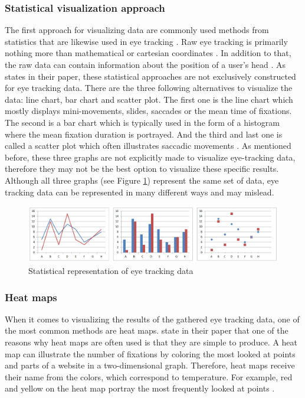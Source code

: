 \subsubsection{Statistical visualization approach}
The first approach for visualizing data are commonly used methods from statistics that are likewise used in eye tracking \autocite{blascheck2014state}. Raw eye tracking is primarily nothing more than mathematical or cartesian coordinates \autocite{blascheck2014state, biedert2010eyebook}. In addition to that, the raw data can contain information about the position of a user's head \autocite[]{biedert2010eyebook}. 
As \textcite[]{blascheck2014state} states in their paper, these statistical approaches are not exclusively constructed for eye tracking data. There are the three following alternatives to visualize the data: line chart, bar chart and scatter plot. The first one is the line chart which mostly displays mini-movements, slides, saccades or the mean time of fixations. The second is a bar chart which is typically used in the form of a histogram where the mean fixation duration is portrayed. And the third and last one is called a scatter plot which often illustrates saccadic movements \autocite[]{blascheck2014state}.
As mentioned before, these three graphs are not explicitly made to visualize eye-tracking data, therefore they may not be the best option to visualize these specific results.  Although all three graphs (see Figure \ref{figure:Statistics}) represent the same set of data, eye tracking data can be represented in many different ways and may mislead. 

\begin{figure}[!ht]
    \centering
    \includegraphics[width=1\linewidth]{images/statistics_blascheck2014state.png}
    \caption{
       Statistical representation of eye tracking data \autocite[7]{blascheck2014state}
    }
    \label{figure:Statistics}
\end{figure}


\subsubsection{Heat maps}
When it comes to visualizing the results of the gathered eye tracking data, one of the most common methods are heat maps. \textcite{bojko2009informative} state in their paper that one of the reasons why heat maps are often used is that they are simple to produce. 
A heat map can illustrate the number of fixations by coloring the most looked at points and parts of a website in a two-dimensional graph. Therefore, heat maps receive their name from the colors, which correspond to temperature. For example, red and yellow on the heat map portray the most frequently looked at points \autocite[]{bojko2009informative}. 

